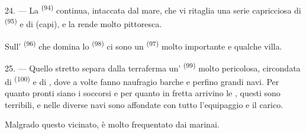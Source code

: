 \VUsaut{3.0mm}
\VUsaut{3.0mm}

24. --- La  \textsuperscript{(94)} continua, intaccata dal mare, che
vi ritaglia una serie capricciosa di  \textsuperscript{(95)} e di
 (capi), e la rende molto pittoresca.

Sull' \textsuperscript{(96)} che domina lo 
\textsuperscript{(98)} ci sono un  \textsuperscript{(97)} molto importante
e qualche villa.

25. --- Quello stretto separa dalla terraferma un'
\textsuperscript{(99)} molto pericolosa, circondata di 
\textsuperscript{(100)} e di , dove a volte fanno naufragio barche e
perfino grandi navi. Per quanto pronti siano i soccorsi e per quanto in fretta
arrivino le , questi  sono terribili,
e nelle  diverse navi sono affondate con tutto
l'equipaggio e il carico.

Malgrado questo vicinato,  è molto frequentato dai marinai.
\VUsaut{6.0mm}
\VUfilet{22mm}
